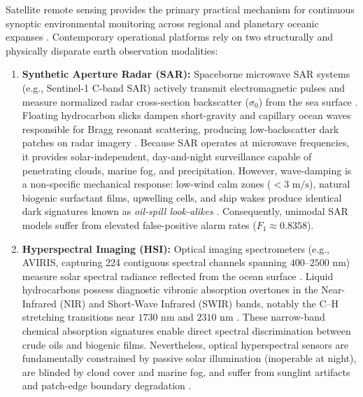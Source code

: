 \documentclass[conference]{IEEEtran}
\begin{document}
Satellite remote sensing provides the primary practical mechanism for continuous synoptic environmental monitoring across regional and planetary oceanic expanses \cite{wan2025dualbranch,javali2021sar,thiyagarajan2024landcover,sundar2024remoteGAN}. Contemporary operational platforms rely on two structurally and physically disparate earth observation modalities:
\begin{enumerate}
    \item \textbf{Synthetic Aperture Radar (SAR):} Spaceborne microwave SAR systems (e.g., Sentinel-1 C-band SAR) actively transmit electromagnetic pulses and measure normalized radar cross-section backscatter ($\sigma_0$) from the sea surface \cite{zhu2022oil,javali2021sar}. Floating hydrocarbon slicks dampen short-gravity and capillary ocean waves responsible for Bragg resonant scattering, producing low-backscatter dark patches on radar imagery \cite{huang2025twostage}. Because SAR operates at microwave frequencies, it provides solar-independent, day-and-night surveillance capable of penetrating clouds, marine fog, and precipitation. However, wave-damping is a non-specific mechanical response: low-wind calm zones ($< 3\text{ m/s}$), natural biogenic surfactant films, upwelling cells, and ship wakes produce identical dark signatures known as \textit{oil-spill look-alikes} \cite{wan2025dualbranch}. Consequently, unimodal SAR models suffer from elevated false-positive alarm rates ($F_1 \approx 0.8358$).
    
    \item \textbf{Hyperspectral Imaging (HSI):} Optical imaging spectrometers (e.g., AVIRIS, capturing 224 contiguous spectral channels spanning $400\text{--}2500\text{ nm}$) measure solar spectral radiance reflected from the ocean surface \cite{zhang2025hyperspectral}. Liquid hydrocarbons possess diagnostic vibronic absorption overtones in the Near-Infrared (NIR) and Short-Wave Infrared (SWIR) bands, notably the $\text{C--H}$ stretching transitions near $1730\text{ nm}$ and $2310\text{ nm}$ \cite{dabbiru2015fusion}. These narrow-band chemical absorption signatures enable direct spectral discrimination between crude oils and biogenic films. Nevertheless, optical hyperspectral sensors are fundamentally constrained by passive solar illumination (inoperable at night), are blinded by cloud cover and marine fog, and suffer from sunglint artifacts and patch-edge boundary degradation \cite{du2025ms3osd}.
\end{enumerate}
\end{document}
